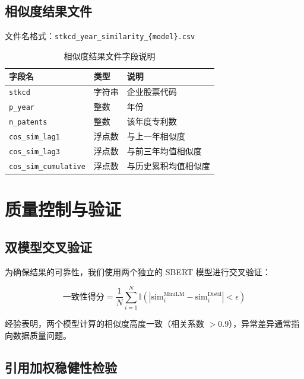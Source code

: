 \documentclass[12pt,a4paper]{article}
\theoremstyle{definition}
\begin{document}
\subsection{相似度结果文件}

文件名格式：\texttt{stkcd\_year\_similarity\_\{model\}.csv}

\begin{table}[H]
    \centering
    \caption{相似度结果文件字段说明}
    \label{tab:output-similarity}
    \begin{tabular}{@{}llp{7cm}@{}}
        \toprule
        \textbf{字段名} & \textbf{类型} & \textbf{说明} \\
        \midrule
        \texttt{stkcd} & 字符串 & 企业股票代码 \\
        \texttt{p\_year} & 整数 & 年份 \\
        \texttt{n\_patents} & 整数 & 该年度专利数 \\
        \texttt{cos\_sim\_lag1} & 浮点数 & 与上一年相似度 \\
        \texttt{cos\_sim\_lag3} & 浮点数 & 与前三年均值相似度 \\
        \texttt{cos\_sim\_cumulative} & 浮点数 & 与历史累积均值相似度 \\
        \bottomrule
    \end{tabular}
\end{table}

\section{质量控制与验证}

\subsection{双模型交叉验证}

为确保结果的可靠性，我们使用两个独立的 SBERT 模型进行交叉验证：

\begin{equation}
    \text{一致性得分} = \frac{1}{N} \sum_{i=1}^{N} \mathbb{I}\left(|\text{sim}_{i}^{\text{MiniLM}} - \text{sim}_{i}^{\text{Distil}}| < \epsilon\right)
\end{equation}

经验表明，两个模型计算的相似度高度一致（相关系数 $> 0.9$），异常差异通常指向数据质量问题。

\subsection{引用加权稳健性检验}
\end{document}
